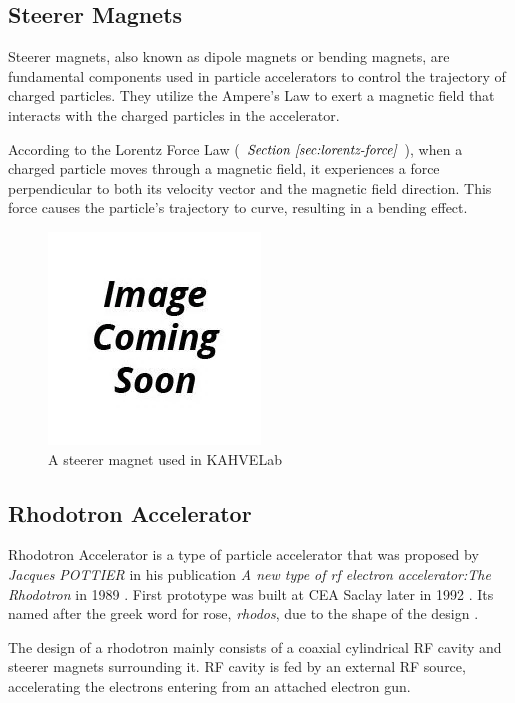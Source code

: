 \documentclass[a4paper,oneside,12pt]{report}
\numberwithin{equation}{chapter}
\begin{document}
\subsection{Steerer Magnets}
Steerer magnets, also known as dipole magnets or bending magnets, are fundamental components used in particle accelerators to control the trajectory of charged particles. 
They utilize the Ampere's Law to exert a magnetic field that interacts with the charged particles in the accelerator. 

According to the Lorentz Force Law ( $\textit{Section \ref{sec:lorentz-force}}$ ), when a charged particle moves through a magnetic field, it experiences a force perpendicular to both its velocity 
vector and the magnetic field direction. This force causes the particle's trajectory to curve, resulting in a bending effect.

\begin{figure}[H]
    \centering
    \includegraphics[scale=0.75]{./figures/to_be_added.png}
    \caption{A steerer magnet used in KAHVELab}
\end{figure}

\subsection{Rhodotron Accelerator}

Rhodotron Accelerator is a type of particle accelerator that was proposed by \textit{Jacques POTTIER} in his publication \textit{A new type of rf electron accelerator:The Rhodotron} in 1989 \cite{rhodo_pottier}. 
First prototype was built at CEA Saclay later in 1992 \cite{rhodo_prototype}. Its named after the greek word for rose, \textit{rhodos}, due to the shape of the design \cite{rhodos}.

The design of a rhodotron mainly consists of a coaxial cylindrical RF cavity and steerer magnets surrounding it. RF cavity is fed by an external RF source, accelerating the electrons entering from an attached electron gun.
\end{document}
